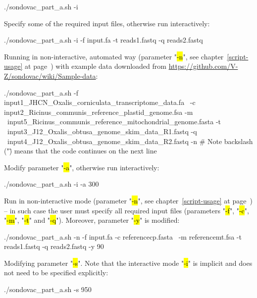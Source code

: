 \documentclass[a4paper, 11pt, twoside]{article}
\renewcommand{\texttt}[1]{\hl{\ttfamily #1}}
\begin{document}
\begin{bashcode}
  ./sondovac_part_a.sh -i
\end{bashcode}

Specify some of the required input files, otherwise run interactively:

\begin{bashcode}
  ./sondovac_part_a.sh -i -f input.fa -t reads1.fastq -q reads2.fastq
\end{bashcode}

Running in non-interactive, automated way (parameter "\texttt{-n}", see chapter~\ref{script-usage} at page~\pageref{script-usage}) with 
example data downloaded from \url{https://github.com/V-Z/sondovac/wiki/Sample-data}:

\begin{bashcode}
  ./sondovac_part_a.sh -f input1_JHCN_Oxalis_corniculata_transcriptome_data.fa \
    -c input2_Ricinus_communis_reference_plastid_genome.fsa -m \
    input5_Ricinus_communis_reference_mitochondrial_genome.fasta -t \
    input3_J12_Oxalis_obtusa_genome_skim_data_R1.fastq -q \
    input4_J12_Oxalis_obtusa_genome_skim_data_R2.fastq -n
  # Note backslash ("\") means that the code continues on the next line
\end{bashcode}

Modify parameter "\texttt{-a}", otherwise run interactively:

\begin{bashcode}
  ./sondovac_part_a.sh -i -a 300
\end{bashcode}

Run in non-interactive mode (parameter "\texttt{-n}", see chapter~\ref{script-usage} at page~\pageref{script-usage}) -- in such case the user must specify all required input files (parameters "\texttt{-f}", "\texttt{-c}", "\texttt{-m}", "\texttt{-t}" and "\texttt{-q}"). Moreover, parameter "\texttt{-y}" is modified:

\begin{bashcode}
  ./sondovac_part_a.sh -n -f input.fa -c referencecp.fasta \
    -m referencemt.fsa -t reads1.fastq -q reads2.fastq -y 90
\end{bashcode}

Modifying parameter "\texttt{-s}". Note that the interactive mode "\texttt{-i}" is implicit and does not need to be specified explicitly:

\begin{bashcode}
  ./sondovac_part_a.sh -s 950
\end{bashcode}
\end{document}
